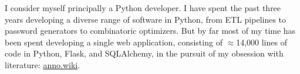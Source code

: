 \documentclass[9pt]{developercv} %
\begin{document}
\vspace{0.5cm}



\begin{minipage}[t]{0.4\textwidth} %
	\vspace{-\baselineskip} %

    I consider myself principally a Python developer. I have spent the past
    three years developing a diverse range of software in Python, from ETL
    pipelines to password generators to combinatoric optimizers. But by far most
    of my time has been spent developing a single web application, consisting of
    $\approx$14,000 lines of code in Python, Flask, and SQLAlchemy, in the pursuit
    of my obsession with literature: {\href{https://github.com/malan88/icc}{anno.wiki}}.
\end{minipage}
\hfill %
\begin{minipage}[t]{0.5\textwidth} %
	\vspace{-\baselineskip} %
	\begin{barchart}{5.5}
	\end{barchart}
\end{minipage}

\begin{center}
\end{center}


\end{document}
